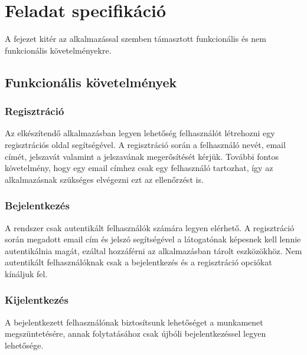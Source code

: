 \chapter{Feladat specifikáció}

A fejezet kitér az alkalmazással szemben támasztott funkcionális és nem funkcionális követelményekre.

\section{Funkcionális követelmények}

\subsection{Regisztráció}
Az elkészítendő alkalmazásban legyen lehetőség felhasználót létrehozni egy regisztrációs oldal segítségével.
A regisztráció során a felhasználó nevét, email címét, jelszavát valamint a jelszavának megerősítését kérjük.
További fontos követelmény, hogy egy email címhez csak egy felhasználó tartozhat, így az alkalmazásnak szükséges elvégezni ezt az ellenőrzést is.

\subsection{Bejelentkezés}
A rendszer csak autentikált felhasználók számára legyen elérhető.
A regisztráció során megadott email cím és jelszó segítségével a látogatónak képesnek kell lennie autentikálnia magát, ezáltal hozzáférni az alkalmazásban tárolt eszközökhöz.
Nem autentikált felhasználóknak csak a bejelentkezés és a regisztráció opciókat kínáljuk fel.

\subsection{Kijelentkezés}
A bejelentkezett felhasználónak biztosítsunk lehetőséget a munkamenet megszüntetésére, annak folytatásához csak újbóli bejelentkezéssel legyen lehetősége.


